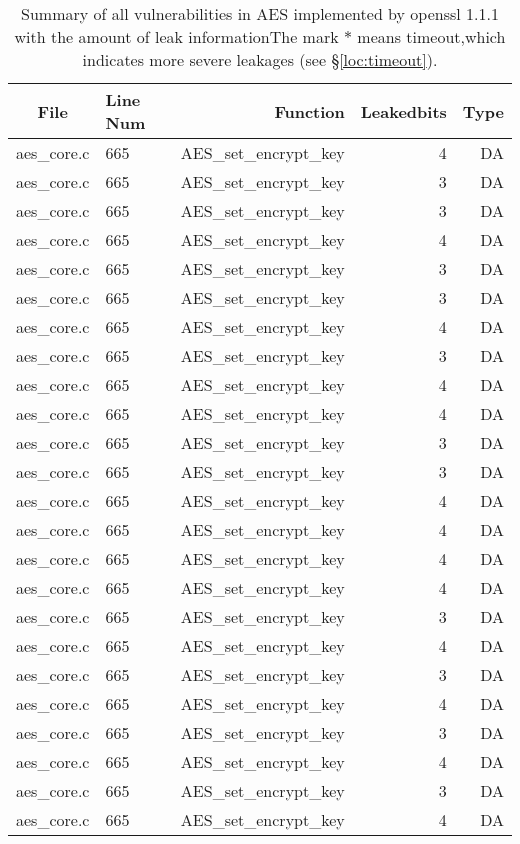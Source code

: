 \begin{table}%
\centering\scriptsize
\caption{Summary of all vulnerabilities in AES implemented by openssl 1.1.1 with the amount of leak informationThe mark $*$ means timeout,which indicates more severe leakages (see \S\ref{loc:timeout}).}\label{tab:AESopenssl}
\begin{tabular}{clrrr}
\hline
\textbf{File} & \textbf{Line Num} & \textbf{Function} & \textbf{Leakedbits} & \textbf{Type} \\\hline
aes\_core.c& 665&AES\_set\_encrypt\_key&4 &DA\\
aes\_core.c& 665&AES\_set\_encrypt\_key&3 &DA\\
aes\_core.c& 665&AES\_set\_encrypt\_key&3 &DA\\
aes\_core.c& 665&AES\_set\_encrypt\_key&4 &DA\\
aes\_core.c& 665&AES\_set\_encrypt\_key&3 &DA\\
aes\_core.c& 665&AES\_set\_encrypt\_key&3 &DA\\
aes\_core.c& 665&AES\_set\_encrypt\_key&4 &DA\\
aes\_core.c& 665&AES\_set\_encrypt\_key&3 &DA\\
aes\_core.c& 665&AES\_set\_encrypt\_key&4 &DA\\
aes\_core.c& 665&AES\_set\_encrypt\_key&4 &DA\\
aes\_core.c& 665&AES\_set\_encrypt\_key&3 &DA\\
aes\_core.c& 665&AES\_set\_encrypt\_key&3 &DA\\
aes\_core.c& 665&AES\_set\_encrypt\_key&4 &DA\\
aes\_core.c& 665&AES\_set\_encrypt\_key&4 &DA\\
aes\_core.c& 665&AES\_set\_encrypt\_key&4 &DA\\
aes\_core.c& 665&AES\_set\_encrypt\_key&4 &DA\\
aes\_core.c& 665&AES\_set\_encrypt\_key&3 &DA\\
aes\_core.c& 665&AES\_set\_encrypt\_key&4 &DA\\
aes\_core.c& 665&AES\_set\_encrypt\_key&3 &DA\\
aes\_core.c& 665&AES\_set\_encrypt\_key&4 &DA\\
aes\_core.c& 665&AES\_set\_encrypt\_key&3 &DA\\
aes\_core.c& 665&AES\_set\_encrypt\_key&4 &DA\\
aes\_core.c& 665&AES\_set\_encrypt\_key&3 &DA\\
aes\_core.c& 665&AES\_set\_encrypt\_key&4 &DA\\

\end{tabular}
\end{table}
